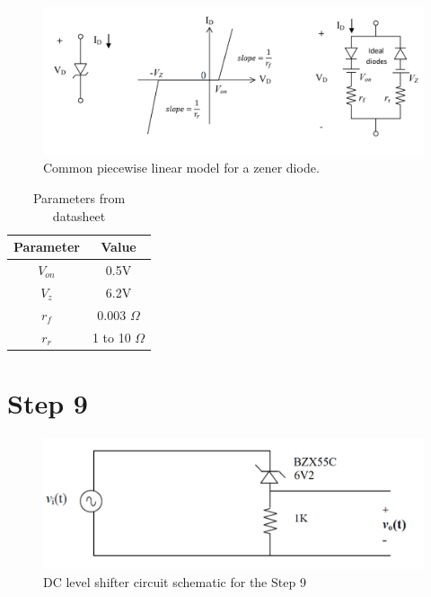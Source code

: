 \documentclass[letterpaper,12pt]{article}
\begin{document}
\begin{figure}[H]
    \centering
   \includegraphics[width=1\textwidth]{8_1.png}
   \caption{Common piecewise linear model for a zener diode.}
\end{figure} 


\begin{table}[H]
    \begin{center}
    \caption{ Parameters from datasheet}
    \vspace{2mm}
    \begin{tabular}{||c | c ||} 
    \hline
    Parameter & Value \\ [0.5ex] 
    \hline\hline
    \(V_{on}\) & 0.5V  \\ 
    \hline
    \(V_z\) & 6.2V  \\ 
    \hline
    \(r_f\) & 0.003 \(\Omega\)  \\ 
    \hline
    \(r_r\)& 1 to 10 \(\Omega\)  \\ 
\hline
\end{tabular}
\end{center}
\end{table}


\section{Step 9}
\begin{figure}[H]
    \centering
   \includegraphics[width=1\textwidth]{9_1.png}
   \caption{DC level shifter circuit schematic for the Step 9}
\end{figure} 
\end{document}
